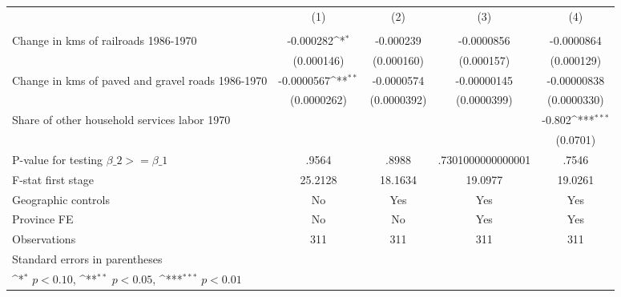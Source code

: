 {
\def\sym#1{\ifmmode^{#1}\else\(^{#1}\)\fi}
\begin{tabular}{l*{4}{c}}
\hline\hline
                &\multicolumn{1}{c}{(1)}&\multicolumn{1}{c}{(2)}&\multicolumn{1}{c}{(3)}&\multicolumn{1}{c}{(4)}\\
                &\multicolumn{1}{c}{}&\multicolumn{1}{c}{}&\multicolumn{1}{c}{}&\multicolumn{1}{c}{}\\
\hline
Change in kms of railroads 1986-1970&-0.000282\sym{*}  &-0.000239         &-0.0000856         &-0.0000864         \\
                &(0.000146)         &(0.000160)         &(0.000157)         &(0.000129)         \\
[1em]
Change in kms of paved and gravel roads 1986-1970&-0.0000567\sym{**} &-0.0000574         &-0.00000145         &-0.00000838         \\
                &(0.0000262)         &(0.0000392)         &(0.0000399)         &(0.0000330)         \\
[1em]
Share of other household services labor 1970&                  &                  &                  &   -0.802\sym{***}\\
                &                  &                  &                  & (0.0701)         \\
\hline
P-value for testing $\beta\_{2} >= \beta\_{1}$&    .9564         &    .8988         &.7301000000000001         &    .7546         \\
F-stat first stage&  25.2128         &  18.1634         &  19.0977         &  19.0261         \\
Geographic controls&       No         &      Yes         &      Yes         &      Yes         \\
Province FE     &       No         &       No         &      Yes         &      Yes         \\
Observations    &      311         &      311         &      311         &      311         \\
\hline\hline
\multicolumn{5}{l}{\footnotesize Standard errors in parentheses}\\
\multicolumn{5}{l}{\footnotesize \sym{*} \(p<0.10\), \sym{**} \(p<0.05\), \sym{***} \(p<0.01\)}\\
\end{tabular}
}
